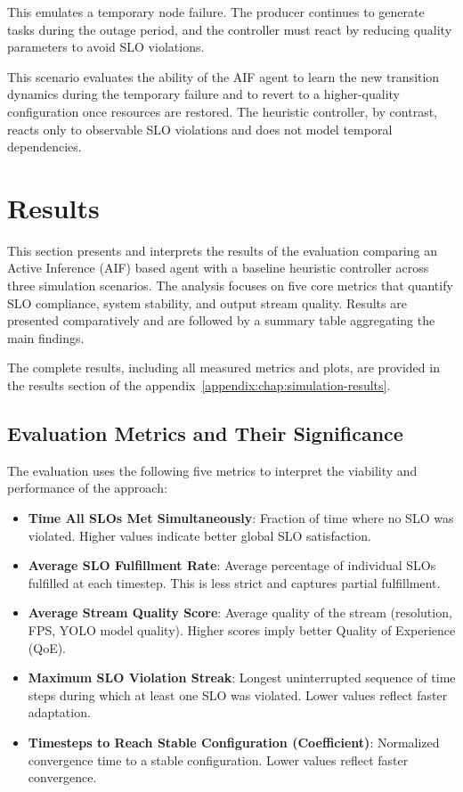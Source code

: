 This emulates a temporary node failure. The producer continues to generate tasks during the outage period, and the controller must react by reducing quality parameters to avoid SLO violations.

This scenario evaluates the ability of the AIF agent to learn the new transition dynamics during the temporary failure and to revert to a higher-quality configuration once resources are restored. The heuristic controller, by contrast, reacts only to observable SLO violations and does not model temporal dependencies.

\section{Results}

This section presents and interprets the results of the evaluation comparing an Active Inference (AIF) based agent with a baseline heuristic controller across three simulation scenarios. The analysis focuses on five core metrics that quantify SLO compliance, system stability, and output stream quality. Results are presented comparatively and are followed by a summary table aggregating the main findings.

The complete results, including all measured metrics and plots, are provided in the results section of the appendix~\ref{appendix:chap:simulation-results}.

\subsection{Evaluation Metrics and Their Significance}

The evaluation uses the following five metrics to interpret the viability and performance of the approach:

\begin{itemize}
  \item \textbf{Time All SLOs Met Simultaneously}: Fraction of time where no SLO was violated. Higher values indicate better global SLO satisfaction.
  \item \textbf{Average SLO Fulfillment Rate}: Average percentage of individual SLOs fulfilled at each timestep. This is less strict and captures partial fulfillment.
  \item \textbf{Average Stream Quality Score}: Average quality of the stream (resolution, FPS, YOLO model quality). Higher scores imply better Quality of Experience (QoE).
  \item \textbf{Maximum SLO Violation Streak}: Longest uninterrupted sequence of time steps during which at least one SLO was violated. Lower values reflect faster adaptation.
  \item \textbf{Timesteps to Reach Stable Configuration (Coefficient)}: Normalized convergence time to a stable configuration. Lower values reflect faster convergence.
\end{itemize}

